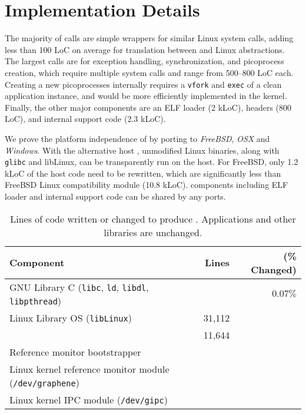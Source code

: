 \section{Implementation Details}
\label{sec:impl}

The majority of \pal{} calls are simple wrappers for similar Linux system calls, 
adding less than 100 LoC on average for translation between \pal{} and Linux abstractions.
The largest \pal{} calls are for exception handling, synchronization, and picoprocess
creation, which require multiple system calls and range from 500--800 LoC each.
Creating a new picoprocesses internally requires a {\tt vfork} and {\tt exec} of a clean 
application instance, and would be more efficiently implemented in the kernel.
Finally, the other major \pal{} components are an ELF loader (2 kLoC), headers (800 LoC),
and internal support code (2.3 kLoC).

\vspace{5pt}
We prove the platform independence of \sysname{}
by porting \pal{} to {\em FreeBSD}, {\em OSX} and {\em Windows}.
With the alternative host \pal{}, unmodified Linux binaries,
along with {\tt glibc} and {libLinux},
can be transparently run on the host.
For FreeBSD,
only 1.2 kLoC of the host \pal{} code need to be rewritten,
which are significantly less than FreeBSD Linux compatibility module (10.8 kLoC).
\pal{} components including ELF loader and internal support code can be shared by any \pal{} ports.


\begin{table}[t!b!]
\footnotesize
\centering
\begin{tabular}{|l|rr|}
\hline
{\bf Component} & {\bf Lines} & ({\bf \% Changed})\\
\hline
GNU Library C ({\tt libc}, {\tt ld}, {\tt libdl}, {\tt libpthread}) & \libclines{} & $0.07\%$ \\
\hline
Linux Library OS ({\tt libLinux}) & 31,112 & \\
\pal{} & 11,644 & \\
\hline
Reference monitor bootstrapper & {} & \\
Linux kernel reference monitor module ({\tt /dev/graphene}) & \sandboxmodlines{} & \\
Linux kernel IPC module ({\tt /dev/gipc}) & \gipclines{} & \\
\hline
\end{tabular}
\caption[\sysname{}: lines of code written or changed]
{Lines of code written or changed to produce \sysname{}.  Applications and other libraries are unchanged.}
\label{tab:LoC}
\end{table}


